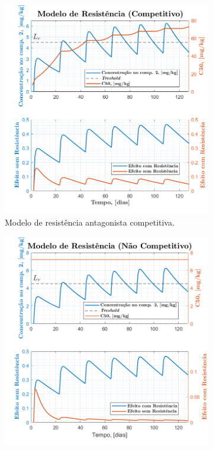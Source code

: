 \vphantom{Experiência 123}

\vphantom{Experiência 123}

\vspace{-2em}
\begin{figure}[ht]
    \begin{subfigure}[b]{0.5\linewidth}
        \centering
        \includegraphics[width=0.9\linewidth]{img/perguntas/P6/P6-compete.png}
        \caption{Modelo de resistência antagonista competitiva.} 
        \label{fig:LABEL-compete} 
    \end{subfigure}%
    \begin{subfigure}[b]{0.5\linewidth}
        \centering
        \includegraphics[width=0.9\linewidth]{img/perguntas/P6/P6-ncompete.png} 

\end{subfigure}
\end{figure}
